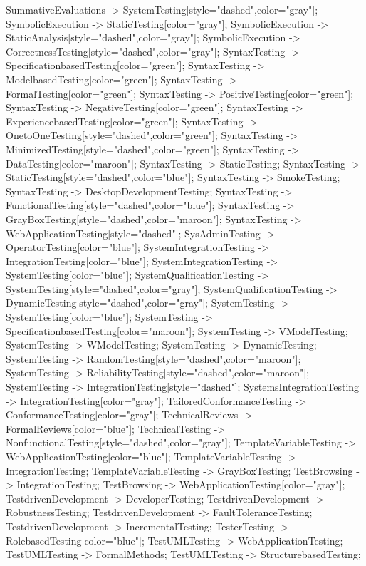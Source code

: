 \documentclass{article}
\begin{document}
{SummativeEvaluations -> SystemTesting[style="dashed",color="gray"];
SymbolicExecution -> StaticTesting[color="gray"];
SymbolicExecution -> StaticAnalysis[style="dashed",color="gray"];
SymbolicExecution -> CorrectnessTesting[style="dashed",color="gray"];
SyntaxTesting -> SpecificationbasedTesting[color="green"];
SyntaxTesting -> ModelbasedTesting[color="green"];
SyntaxTesting -> FormalTesting[color="green"];
SyntaxTesting -> PositiveTesting[color="green"];
SyntaxTesting -> NegativeTesting[color="green"];
SyntaxTesting -> ExperiencebasedTesting[color="green"];
SyntaxTesting -> OnetoOneTesting[style="dashed",color="green"];
SyntaxTesting -> MinimizedTesting[style="dashed",color="green"];
SyntaxTesting -> DataTesting[color="maroon"];
SyntaxTesting -> StaticTesting;
SyntaxTesting -> StaticTesting[style="dashed",color="blue"];
SyntaxTesting -> SmokeTesting;
SyntaxTesting -> DesktopDevelopmentTesting;
SyntaxTesting -> FunctionalTesting[style="dashed",color="blue"];
SyntaxTesting -> GrayBoxTesting[style="dashed",color="maroon"];
SyntaxTesting -> WebApplicationTesting[style="dashed"];
SysAdminTesting -> OperatorTesting[color="blue"];
SystemIntegrationTesting -> IntegrationTesting[color="blue"];
SystemIntegrationTesting -> SystemTesting[color="blue"];
SystemQualificationTesting -> SystemTesting[style="dashed",color="gray"];
SystemQualificationTesting -> DynamicTesting[style="dashed",color="gray"];
SystemTesting -> SystemTesting[color="blue"];
SystemTesting -> SpecificationbasedTesting[color="maroon"];
SystemTesting -> VModelTesting;
SystemTesting -> WModelTesting;
SystemTesting -> DynamicTesting;
SystemTesting -> RandomTesting[style="dashed",color="maroon"];
SystemTesting -> ReliabilityTesting[style="dashed",color="maroon"];
SystemTesting -> IntegrationTesting[style="dashed"];
SystemsIntegrationTesting -> IntegrationTesting[color="gray"];
TailoredConformanceTesting -> ConformanceTesting[color="gray"];
TechnicalReviews -> FormalReviews[color="blue"];
TechnicalTesting -> NonfunctionalTesting[style="dashed",color="gray"];
TemplateVariableTesting -> WebApplicationTesting[color="blue"];
TemplateVariableTesting -> IntegrationTesting;
TemplateVariableTesting -> GrayBoxTesting;
TestBrowsing -> IntegrationTesting;
TestBrowsing -> WebApplicationTesting[color="gray"];
TestdrivenDevelopment -> DeveloperTesting;
TestdrivenDevelopment -> RobustnessTesting;
TestdrivenDevelopment -> FaultToleranceTesting;
TestdrivenDevelopment -> IncrementalTesting;
TesterTesting -> RolebasedTesting[color="blue"];
TestUMLTesting -> WebApplicationTesting;
TestUMLTesting -> FormalMethods;
TestUMLTesting -> StructurebasedTesting;
}
\end{document}
